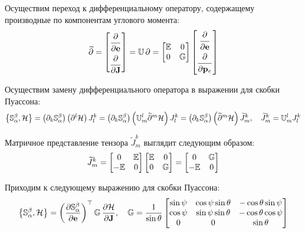 Осуществим переход к дифференциальному оператору, содержащему производные по компонентам углового момента: 
\begin{gather}
	\widetilde{\partial} = 
	\begin{bmatrix}
		\dfrac{\strut\partial}{\strut\partial \mathbf{e}} \\
		\dfrac{\strut\partial}{\partial \mathbf{J}} \\
	\end{bmatrix} = \mathbb{U} \, \partial =  
	\begin{bmatrix}
		\mathbb{E} & 0 \\
		0 & \mathbb{G}
	\end{bmatrix}
	\begin{bmatrix}
		\dfrac{\strut\partial}{\strut\partial \mathbf{e}} \\
		\dfrac{\strut\partial}{\strut\partial \mathbf{p}_e} \\
	\end{bmatrix} \notag
\end{gather}

Осуществим замену дифференциального оператора в выражении для скобки Пуассона:
\begin{gather}
	\left\{ \mathbb{S}^\beta_\alpha , \mathcal{H} \right\} = \left( \partial_k \mathbb{S}^\beta_\alpha \right) \left( \partial^l \mathcal{H} \right) J^k_l = \left( \partial_k \mathbb{S}^\beta_\alpha \right) \left( \mathbb{U}^l_m \widetilde{\partial}^m \mathcal{H} \right) J^k_l = \left( \partial_k \mathbb{S}^\beta_\alpha \right) \left( \widetilde{\partial}^m \mathcal{H} \right) \widetilde{J}^k_m, \quad \widetilde{J}^k_m = \mathbb{U}^l_m J^k_l \notag 
\end{gather}

Матричное представление тензора $\widetilde{J}_m^k$ выглядит следующим образом:
\begin{gather}
	\widetilde{J}_m^k = 
	\begin{bmatrix}
		0 & \mathbb{E} \\
		-\mathbb{E} & 0
	\end{bmatrix} 
	\begin{bmatrix}
		\mathbb{E} & 0 \\
		0 & \mathbb{G}
	\end{bmatrix} = 
	\begin{bmatrix}
		0 & \mathbb{G} \\
		-\mathbb{E} & 0
	\end{bmatrix} \notag
\end{gather}

Приходим к следующему выражению для скобки Пуассона:
\begin{gather}
	\left\{ \mathbb{S}_\alpha^\beta, \mathcal{H} \right\} = \left( \frac{\partial \mathbb{S}_\alpha^\beta}{\partial \mathbf{e}} \right)^\top \mathbb{G} \, \frac{\partial \mathcal{H}}{\partial \mathbf{J}}, \quad \mathbb{G} = \frac{1}{\sin \theta}
\begin{bmatrix}
	\sin \psi & \cos \psi \sin \theta & -\cos \theta \sin \psi \\
	\cos \psi & \sin \psi \sin \theta & - \cos \theta \cos \psi \\
	0 & 0 & \sin \theta
\end{bmatrix} \notag
\end{gather}

